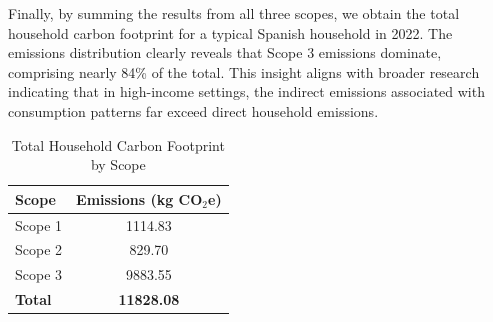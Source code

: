 \documentclass[12pt,a4paper]{article}%
\begin{document}
\begin{table}[h]
\centering
\caption{Consumption-Based Emissions (Scope 3)}
\label{tab:scope3}
\end{table}

Finally, by summing the results from all three scopes, we obtain the total household carbon footprint for a typical Spanish household in 2022. The emissions distribution clearly reveals that Scope 3 emissions dominate, comprising nearly 84\% of the total. This insight aligns with broader research indicating that in high-income settings, the indirect emissions associated with consumption patterns far exceed direct household emissions.

\begin{table}[h]
\centering
\caption{Total Household Carbon Footprint by Scope}
\label{tab:total_emissions}
\begin{tabular}{|l|c|}
\hline
\textbf{Scope} & \textbf{Emissions (kg CO$_2$e)} \\
\hline
Scope 1 & 1114.83 \\
Scope 2 & 829.70 \\
Scope 3 & 9883.55 \\
\textbf{Total} & \textbf{11828.08} \\
\hline
\end{tabular}
\end{table}
\end{document}
